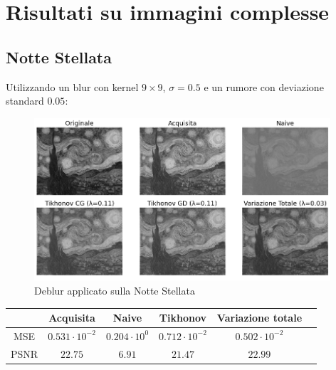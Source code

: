 \documentclass[11pt]{article}
\begin{document}
\newpage
\section{Risultati su immagini complesse}

\subsection{Notte Stellata}
Utilizzando un blur con kernel $9 \times 9$, $\sigma=0.5$ e un rumore con deviazione standard $0.05$:
\begin{figure}[H]
    \centering
    \includegraphics[width=11cm]{reale/1/1/deblur.png}
    \caption{Deblur applicato sulla Notte Stellata}
    \label{fig:deblur_reale1_1}
\end{figure}
\begin{center}
    \begin{tabular}{ |c|c|c|c|c|c| }
    \hline
    & Acquisita & Naive & Tikhonov & Variazione totale \\ 
    \hline
    MSE & $0.531 \cdot 10^{-2}$ & $0.204 \cdot 10^{0}$ & $0.712 \cdot 10^{-2}$ & $0.502 \cdot 10^{-2}$ \\ 
    PSNR & $22.75$ & $6.91$ & $21.47$ & $22.99$ \\ 
    \hline
    \end{tabular}
\end{center}
\end{document}
